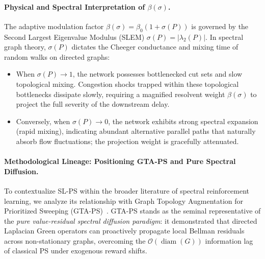\documentclass[11pt,a4paper]{article}
\begin{document}
\paragraph{Physical and Spectral Interpretation of $\beta(\sigma)$.}
The adaptive modulation factor $\beta(\sigma) = \beta_0 (1 + \sigma(P))$ is governed by the Second Largest Eigenvalue Modulus (SLEM) $\sigma(P) = |\lambda_2(P)|$. In spectral graph theory, $\sigma(P)$ dictates the Cheeger conductance and mixing time of random walks on directed graphs:
\begin{itemize}
    \item When $\sigma(P) \to 1$, the network possesses bottlenecked cut sets and slow topological mixing. Congestion shocks trapped within these topological bottlenecks dissipate slowly, requiring a magnified resolvent weight $\beta(\sigma)$ to project the full severity of the downstream delay.
    \item Conversely, when $\sigma(P) \to 0$, the network exhibits strong spectral expansion (rapid mixing), indicating abundant alternative parallel paths that naturally absorb flow fluctuations; the projection weight is gracefully attenuated.
\end{itemize}

\paragraph{Methodological Lineage: Positioning GTA-PS and Pure Spectral Diffusion.}
To contextualize SL-PS within the broader literature of spectral reinforcement learning, we analyze its relationship with Graph Topology Augmentation for Prioritized Sweeping (GTA-PS)~\cite{gta_ps2025}. GTA-PS stands as the seminal representative of the \textit{pure value-residual spectral diffusion paradigm}: it demonstrated that directed Laplacian Green operators can proactively propagate local Bellman residuals across non-stationary graphs, overcoming the $\mathcal{O}(\operatorname{diam}(G))$ information lag of classical PS under exogenous reward shifts.
\end{document}
